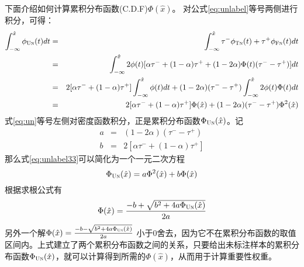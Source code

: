下面介绍如何计算累积分布函数(C.D.F)$\Phi (\hat{x})$。
对公式\eqref{eq:unlabel}等号两侧进行积分，可得：
\begin{eqnarray}
\int_{-\infty}^{\hat x}  \phi_{\textsc{Un}}(t) dt 
	&=& \int_{-\infty}^{\hat x} \tau^-\phi_{\textsc{Tn}}(t) +\tau^+\phi_{\textsc{Fn}}(t) dt \label{eq:un}\\
	&=& \int_{-\infty}^{\hat x} 2\phi(t)[\alpha\tau^- + (1- \alpha)\tau^+  + (1-2\alpha)\Phi(t)(\tau^- -\tau^+)] dt\nonumber\\ 
	&=&  2[\alpha\tau^- + (1- \alpha)\tau^+]\int_{-\infty}^{\hat x} \phi(t) dt + (1-2\alpha)(\tau^- -\tau^+)\int_{-\infty}^{\hat x} 2 \phi(t) \Phi(t) dt \nonumber\\
	&=& 2[\alpha\tau^- + (1- \alpha)\tau^+] \Phi(\hat{x}) + (1-2\alpha)(\tau^- -\tau^+)\Phi^2(\hat{x}) \label{eq:unlabel33}
\end{eqnarray}
式\eqref{eq:un}等号左侧对密度函数积分，正是累积分布函数$\Phi_{\textsc{Un}}(\hat{x})$。记
\begin{eqnarray}
	a &=&  (1-2\alpha)(\tau^- -\tau^+)\nonumber \\
	b &=& 2[\alpha\tau^- + (1- \alpha)\tau^+] \nonumber
\end{eqnarray}
那么式\eqref{eq:unlabel33}可以简化为一个一元二次方程
\[\Phi_{\textsc{Un}}(\hat{x})= a\Phi^2(\hat{x}) + b\Phi(\hat{x})\]
根据求根公式有
\begin{eqnarray}\label{eq:Phi}
	\Phi(\hat{x}) = \frac{-b+\sqrt{b^2+4a\Phi_{\textsc{Un}}(\hat{x})}}{2a}
\end{eqnarray}
另外一个解$\Phi(\hat{x}) = \frac{-b-\sqrt{b^2+4a\Phi_{\textsc{Un}}(\hat{x})}}{2a}$ 小于0舍去，因为它不在累积分布函数的取值区间内。上式建立了两个累积分布函数之间的关系，只要给出未标注样本的累积分布函数$\Phi_{\textsc{Un}}(\hat{x})$，就可以计算得到所需的$\Phi(\hat{x})$，从而用于计算重要性权重。

